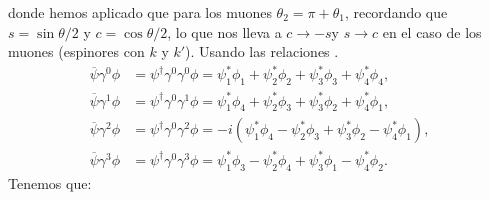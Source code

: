 donde hemos aplicado que para los muones $\theta_2 = \pi + \theta_1$, recordando que $s=\sin \theta/2$ y $c=\cos\theta/2$,  lo que nos lleva a $c\to -s $y  $s \to c$ en el caso de los muones (espinores con $k$ y $k'$). Usando las relaciones \cite{SaboridoSilva2025ParticlePhysicsI,thomson_modern_physics}. 
\begin{align}
	\overline{\psi}\gamma^0\phi & = \psi^\dagger \gamma^0 \gamma^0 \phi
	= \psi_1^*\phi_1 + \psi_2^*\phi_2 + \psi_3^*\phi_3 + \psi_4^*\phi_4,     \\
	\overline{\psi}\gamma^1\phi & = \psi^\dagger \gamma^0 \gamma^1 \phi
	= \psi_1^*\phi_4 + \psi_2^*\phi_3 + \psi_3^*\phi_2 + \psi_4^*\phi_1,     \\
	\overline{\psi}\gamma^2\phi & = \psi^\dagger \gamma^0 \gamma^2 \phi
	= -i(\psi_1^*\phi_4 - \psi_2^*\phi_3 + \psi_3^*\phi_2 - \psi_4^*\phi_1), \\
	\overline{\psi}\gamma^3\phi & = \psi^\dagger \gamma^0 \gamma^3 \phi
	= \psi_1^*\phi_3 - \psi_2^*\phi_4 + \psi_3^*\phi_1 - \psi_4^*\phi_2.
\end{align}
Tenemos que:

